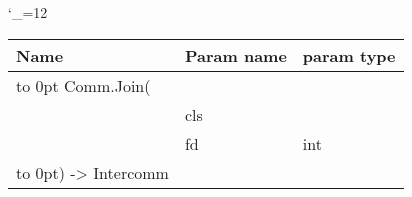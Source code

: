\begingroup \catcode`\_=12 \tt
\begin{tabular}{lll}
\toprule
\textrm{Name}&\textrm{Param name}&\textrm{param type}\\
\midrule
\hbox to 0pt {Comm.Join(\hss}\\
& cls\\
& fd & int\\
\hbox to 0pt{) -> Intercomm\hss}\\
\bottomrule
\end{tabular}
\endgroup
